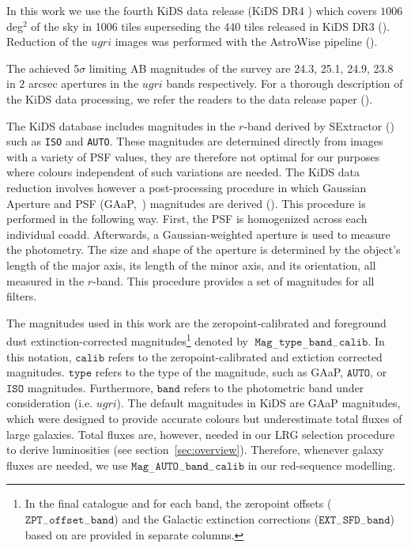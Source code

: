 \documentclass[fleqn,usenatbib,useAMS]{mnras}
\begin{document}
In this work we use the fourth KiDS data release (KiDS DR4 \citealt{kuijken2019}) which covers $1006$ deg$^{2}$ of the sky in 1006 tiles superseding the 440 tiles released in KiDS DR3 (\citealt{kids_dr3}). Reduction of the $ugri$ images was performed with the AstroWise pipeline (\citealt{omegacam}).  


The achieved 5$\sigma$ limiting AB magnitudes of the survey are 24.3, 25.1, 24.9, 23.8 in $2$ arcsec apertures in the $ugri$ bands respectively. For a thorough description of the KiDS data processing, we refer the readers to the data release paper (\citealt{kuijken2019}). 

The KiDS database includes magnitudes in the $r$-band derived by SExtractor (\citealt{sextractor}) such as \texttt{ISO} and \texttt{AUTO}. These magnitudes are determined directly from images with a variety of PSF values, they are therefore not optimal for our purposes where colours independent of such variations are needed. The KiDS data reduction involves however a post-processing procedure in which Gaussian Aperture and PSF (GAaP,~\citealt{gaap}) magnitudes are derived (\citealt{kuijken2015}). This procedure is performed in the following way. First, the PSF is homogenized across each individual coadd. Afterwards, a Gaussian-weighted aperture is used to measure the photometry. The size and shape of the aperture is determined by the object's length of the major axis, its length of the minor axis, and its orientation, all measured in the $r$-band. This procedure provides a set of magnitudes for all filters. 

The magnitudes used in this work are the zeropoint-calibrated and foreground dust extinction-corrected magnitudes\footnote{In the final catalogue and for each band, the zeropoint offsets ($\mathtt{ZPT}_{-}\mathtt{offset}_{-}\mathtt{band}$) and the Galactic extinction corrections ($\mathtt{EXT}_{-}\mathtt{SFD}_{-}\mathtt{band}$) based on \citet{schlegel98} are provided in separate columns.} 
denoted by $\; \mathtt{Mag}_{-}\mathtt{type}_{-}\mathtt{band}_{-}\mathtt{calib}$. 
In this notation, $\mathtt{calib}$ refers to the zeropoint-calibrated and extiction corrected magnitudes. $\mathtt{type}$ refers to the type of the magnitude, such as GAaP, $\mathtt{AUTO}$, or $\mathtt{ISO}$ magnitudes. Furthermore, $\mathtt{band}$ refers to the photometric band under consideration (i.e. $ugri$). The default magnitudes in KiDS are GAaP magnitudes, which were designed to provide accurate colours but underestimate total fluxes of large galaxies. Total fluxes are, however, needed in our LRG selection procedure to derive luminosities (see section~\ref{sec:overview}). Therefore, whenever galaxy fluxes are needed, we use $\mathtt{Mag}_{-}\mathtt{AUTO}_{-}\mathtt{band}_{-}\mathtt{calib}$ in our red-sequence modelling. 
\end{document}
